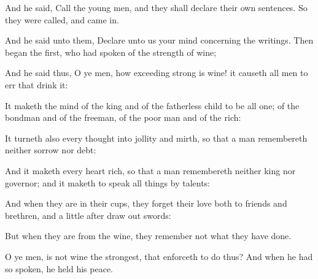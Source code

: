 {\par }{\PP {}And he said, Call the young men, and they shall declare their own sentences. So they were called, and came in.
\par }{\PP {}And he said unto them, Declare unto us your mind concerning the writings. Then began the first, who had spoken of the strength of wine;
\par }{\PP {}And he said thus, O ye men, how exceeding strong is wine! it causeth all men to err that drink it:
\par }{\PP {}It maketh the mind of the king and of the fatherless child to be all one; of the bondman and of the freeman, of the poor man and of the rich:
\par }{\PP {}It turneth also every thought into jollity and mirth, so that a man remembereth neither sorrow nor debt:
\par }{\PP {}And it maketh every heart rich, so that a man remembereth neither king nor governor; and it maketh to speak all things by talents:
\par }{\PP {}And when they are in their cups, they forget their love both to friends and brethren, and a little after draw out swords:
\par }{\PP {}But when they are from the wine, they remember not what they have done.
\par }{\PP {}O ye men, is not wine the strongest, that enforceth to do thus? And when he had so spoken, he held his peace.

}
